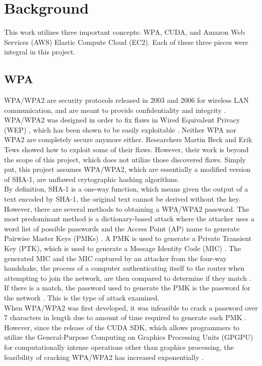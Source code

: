 \documentclass[12pt]{article}
\begin{document}
\section{Background}
\indent This work utilizes three important concepts: WPA, CUDA, and Amazon Web Services (AWS) Elastic Compute Cloud (EC2). Each of these three pieces were integral in this project.
\subsection{WPA}
WPA/WPA2 are security protocols released in 2003 and 2006 for wireless LAN communication, and are meant to provide confidentiality and integrity \cite{ieee} . WPA/WPA2 was designed in order to fix flaws in Wired Equivalent Privacy (WEP) \cite{practical}, which has been shown to be easily exploitable \cite{wep}. Neither WPA nor WPA2 are completely secure anymore either. Researchers Martin Beck and Erik Tews showed how to exploit some of their flaws\cite{tews}. However, their work is beyond the scope of this project, which does not utilize those discovered flaws. Simply put, this project assumes WPA/WPA2, which are essentially a modified version of SHA-1, are unflawed crytographic hashing algorithms.\\
\indent By definition, SHA-1 is a one-way function, which means given the output of a text encoded by SHA-1, the original text cannot be derived without the key\cite{sha1}. However, there are several methods to obtaining a WPA/WPA2 password. The most predominant method is a dictionary-based attack where the attacker uses a word list of possible passwords and the Access Point (AP) name to generate Pairwise Master Keys (PMKs) \cite{cck}. A PMK is used to generate a Private Transient Key (PTK), which is used to generate a Message Identity Code (MIC) \cite{cck}. The generated MIC and the MIC captured by an attacker from the four-way handshake, the process of a computer authenticating itself to the router when attempting to join the network, are then compared to determine if they match \cite{cck}. If there is a match, the password used to generate the PMK is the password for the network \cite{cck}. This is the type of attack examined. \\
\indent When WPA/WPA2 was first developed, it was infeasible to crack a password over 7 characters in length due to amount of time required to generate each PMK \cite{gpu}. However, since the release of the CUDA SDK, which allows programmers to utilize the General-Purpose Computing on Graphics Processing Units (GPGPU) for computationally intense operations other than graphics processing, the feasibility of cracking WPA/WPA2 has increased exponentially \cite{gpu}.
\end{document}
